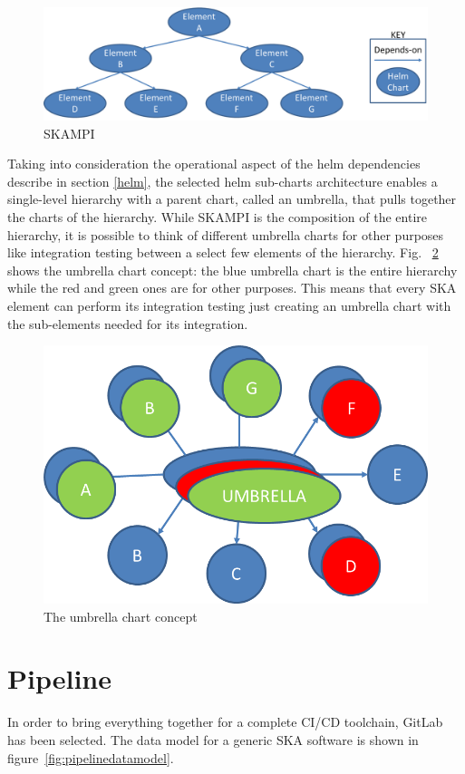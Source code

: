 \documentclass[a4paper,
               keeplastbox,   %
               ]{jacow}
\begin{document}
\begin{figure}[!htb]
   \centering
   \includegraphics*[width=0.8\columnwidth]{simple_skampi}
   \caption{SKAMPI}
   \label{fig:skampi}
\end{figure}

Taking into consideration the operational aspect of the helm dependencies describe in section \ref{helm}, the selected helm sub-charts architecture enables a single-level hierarchy with a parent chart, called an umbrella, that pulls together the charts of the hierarchy. While SKAMPI is the composition of the entire hierarchy, it is possible to think of different umbrella charts for other purposes like integration testing between a select few elements of the hierarchy. Fig. ~\ref{fig:umbrella_chart} shows the umbrella chart concept: the blue umbrella chart is the entire hierarchy while the red and green ones are for other purposes. This means that every SKA element can perform its integration testing just creating an umbrella chart with the sub-elements needed for its integration.

\begin{figure}[!htb]
   \centering
   \includegraphics*[width=0.5\columnwidth]{umbrella_chart.png}
   \caption{The umbrella chart concept}
   \label{fig:umbrella_chart}
\end{figure}

\section{Pipeline} \label{pipeline}

In order to bring everything together for a complete CI/CD toolchain, GitLab~\cite{gitlab} has been selected. The data model for a generic SKA software is shown in figure~\ref{fig:pipelinedatamodel}.
\end{document}
